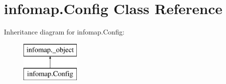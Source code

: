 \hypertarget{classinfomap_1_1Config}{}\section{infomap.\+Config Class Reference}
\label{classinfomap_1_1Config}
Inheritance diagram for infomap.\+Config\+:\begin{figure}[H]
\begin{center}
\leavevmode
\includegraphics[height=2.000000cm]{classinfomap_1_1Config}
\end{center}
\end{figure}
